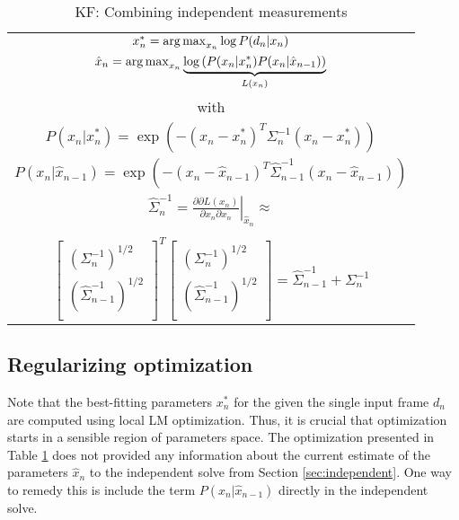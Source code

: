 \begin{table}[!h] 
\centering
\caption{KF: Combining independent measurements\label{tab:kf-like}} 
\begin{tabular}{|c|}
\hline
$x_n^* = \operatorname*{arg\,max}_{x_n} \log P(d_n|x_n)$ \\
$\hat{x}_n = \operatorname*{arg\,max}_{x_n} \underbrace{\log \left( P(x_n|x_n^*) P(x_n |\hat{x}_{n - 1}) \right)}_{L(x_n)}$\\
with \\
$P(x_n |x_n^*) = \exp \left( - (x_n - x_n^* )^T \Sigma_n^{-1}(x_n - x_n^* )\right)$ \\
$P(x_n |\hat{x}_{n - 1}) = \exp \left( - (x_n - \hat{x}_{n - 1} )^T \hat{\Sigma}_{n - 1}^{-1} (x_n - \hat{x}_{n - 1} )\right)$ \\	

$\hat{\Sigma}_n^{-1} = \left. \tfrac{\partial \partial L(x_n)}{\partial x_n \partial x_n}\right|_{\hat{x}_n} \approx $ \\
\\
$\left[
	\begin{array}{cc}
		\left(\Sigma_n^{-1}\right)^{1/2} \\
		\left(\hat{\Sigma}_{n - 1}^{-1}\right)^{1/2} \\
	\end{array}
\right]^T 
\left[
	\begin{array}{c}
		\left(\Sigma_n^{-1}\right)^{1/2} \\
		\left(\hat{\Sigma}_{n - 1}^{-1}\right)^{1/2} \\
	\end{array}
\right] = \hat{\Sigma}_{n-1}^{-1}  + \Sigma_{n}^{-1}$ \\

\hline
\end{tabular}
\end{table}

\subsection{Regularizing optimization}

Note that the best-fitting parameters $x_n^*$ for the given the single input frame $d_n$ are computed using local LM optimization. Thus, it is crucial that optimization starts in a sensible region of parameters space. The optimization presented in Table \ref{tab:kf-like} does not provided any information about the current estimate of the parameters $\hat{x}_n$ to the independent solve from Section \ref{sec:independent}. One way to remedy this is include the term $P(x_n |\hat{x}_{n - 1})$ directly in the independent solve.


